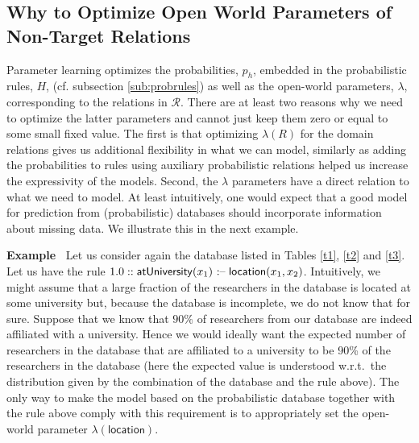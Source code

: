 \documentclass[akbc,twoside,11pt]{article}
\newcounter{example}
\newenvironment{example}[1][]{\refstepcounter{example}\par\medskip\noindent
   \textbf{Example~\theexample #1} \rmfamily}{\medskip}
\newcommand{\ondrej}[1]{\textcolor{red}{O: {#1}}}
\newcommand{\guy}[1]{\textcolor{red}{G: {#1}}}
\begin{document}
\iffalse %
\subsection{Why to Optimize Open World Parameters of Non-Target Relations}


Parameter learning optimizes the probabilities, $p_h$, embedded in the probabilistic rules, $H$, (cf. subsection \ref{sub:probrules}) %
as well as the open-world parameters, $\lambda$, corresponding to the relations in $\mathcal{R}$. There are at least two reasons why we need to optimize the latter parameters and cannot just keep them zero or equal to some small fixed value. The first is that optimizing $\lambda(R)$ for the domain relations gives us additional flexibility in what we can model, similarly as adding the probabilities to rules using auxiliary probabilistic relations helped us increase the expressivity of the models. Second, the $\lambda$ parameters have a direct relation to what we need to model. At least intuitively, one would expect that a good model for prediction from (probabilistic) databases should incorporate information about missing data. We illustrate this in the next example.

\begin{example}
Let us consider again the database listed in Tables \ref{t1}, \ref{t2} and \ref{t3}. Let us have the rule $1.0 :: \mathsf{atUniversity}(x_1) \mbox{ \textnormal{:--}}\; \mathsf{location}(x_1,x_2)$. Intuitively, we might assume that a large fraction of the researchers in the database is located at some university but, because the database is incomplete, we do not know that for sure. Suppose that we know that $90\%$ of researchers from our database are indeed affiliated with a university. Hence we would ideally want the expected number of researchers in the database that are affiliated to a university to be 90\% of the researchers in the database (here the expected value is understood w.r.t.\ the distribution given by the combination of the database and the rule above). The only way to make the model based on the probabilistic database together with the rule above comply with this requirement is to appropriately set the open-world parameter $\lambda(\mathsf{location})$.
\end{example}
\end{document}
